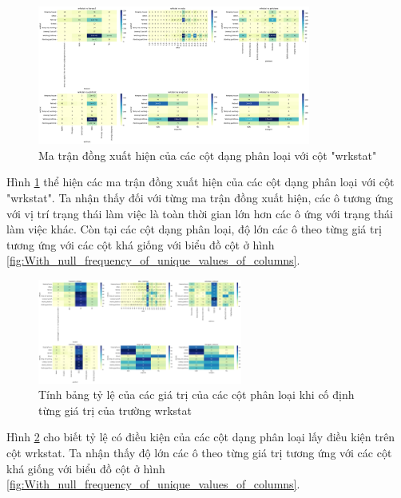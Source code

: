 \begin{figure}[H]
    \centering
    \includegraphics[width=0.8\textwidth]{figures/Thanh/Data_Analysis/With_null_cooccurrence_matrix_categorical_columns_vs_wrkstat.png}
    \caption{Ma trận đồng xuất hiện của các cột dạng phân loại với cột "wrkstat"}
    \label{fig:With_null_cooccurrence_matrix_categorical_columns_vs_wrkstat}
\end{figure}

Hình \ref{fig:With_null_cooccurrence_matrix_categorical_columns_vs_wrkstat} thể hiện các ma trận đồng xuất hiện của các cột dạng phân loại với cột "wrkstat".
Ta nhận thấy đối với từng ma trận đồng xuất hiện, các ô tương ứng với vị trí trạng thái làm việc là toàn thời gian lớn hơn các ô ứng với trạng thái làm việc khác.
Còn tại các cột dạng phân loại, độ lớn các ô theo từng giá trị tương ứng với các cột khá giống với biểu đồ cột ở hình \ref{fig:With_null_frequency_of_unique_values_of_columns}.

\begin{figure}[H]
    \centering
    \includegraphics[width=0.6\textwidth]{figures/Thanh/Data_Analysis/With_null_percentage_matrix_categorical_columns_condition_on_wrkstat.png}
    \caption{Tính bảng tỷ lệ của các giá trị của các cột phân loại khi cố định từng giá trị của trường wrkstat}
    \label{fig:With_null_percentage_matrix_categorical_columns_condition_on_wrkstat}
\end{figure}

Hình \ref{fig:With_null_percentage_matrix_categorical_columns_condition_on_wrkstat} cho biết tỷ lệ có điều kiện của các cột dạng phân loại lấy điều kiện trên cột wrkstat.
Ta nhận thấy độ lớn các ô theo từng giá trị tương ứng với các cột khá giống với biểu đồ cột ở hình \ref{fig:With_null_frequency_of_unique_values_of_columns}.

